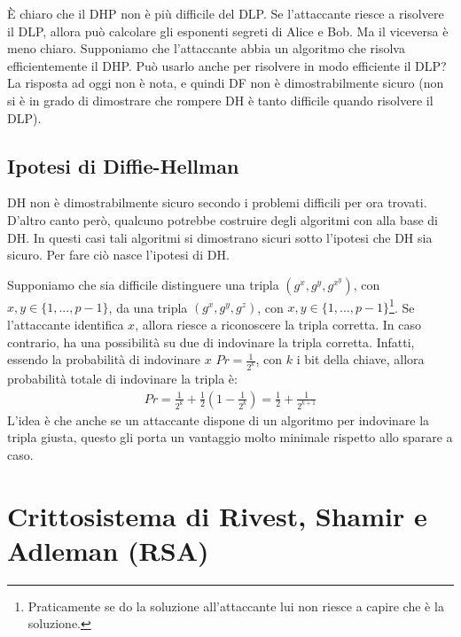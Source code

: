 \noindent È chiaro che il DHP non è più difficile del DLP. Se l'attaccante riesce a risolvere il DLP, allora può calcolare gli esponenti segreti di Alice e Bob. Ma il viceversa è meno chiaro. Supponiamo che l'attaccante abbia un algoritmo che risolva efficientemente il DHP. Può usarlo anche per risolvere in modo efficiente il DLP? La risposta ad oggi non è nota, e quindi DF non è dimostrabilmente sicuro (non si è in grado di dimostrare che rompere DH è tanto difficile quando risolvere il DLP).\\

\subsection{Ipotesi di Diffie-Hellman}
DH non è dimostrabilmente sicuro secondo i problemi difficili per ora trovati. D'altro canto però, qualcuno potrebbe costruire degli algoritmi con alla base di DH. In questi casi tali algoritmi si dimostrano sicuri sotto l'ipotesi che DH sia sicuro. Per fare ciò nasce l'ipotesi di DH.

Supponiamo che sia difficile distinguere una tripla $(g^x, g^y, g^x^y)$, con $x, y \in \{1, ..., p-1\}$, da una tripla $(g^x, g^y, g^z)$, con $x, y \in \{1, ..., p-1\}$\footnote{Praticamente se do la soluzione all'attaccante lui non riesce a capire che è la soluzione.}. Se l'attaccante identifica $x$, allora riesce a riconoscere la tripla corretta. In caso contrario, ha una possibilità su due di indovinare la tripla corretta. Infatti, essendo la probabilità di indovinare $x$ $Pr=\frac{1}{2^k}$, con $k$ i bit della chiave, allora probabilità totale di indovinare la tripla è:
\begin{align*}
    Pr = \frac{1}{2^k} + \frac{1}{2} (1 - \frac{1}{2^k}) = \frac{1}{2} + \frac{1}{2^{k+1}}
\end{align*}
\noindent L'idea è che anche se un attaccante dispone di un algoritmo per indovinare la tripla giusta, questo gli porta un vantaggio molto minimale rispetto allo sparare a caso.

\section{Crittosistema di Rivest, Shamir e Adleman (RSA)}


